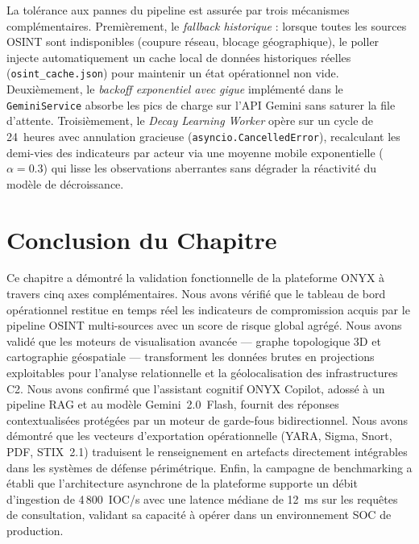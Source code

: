 La tolérance aux pannes du pipeline est assurée par trois mécanismes complémentaires. Premièrement, le \textit{fallback historique} : lorsque toutes les sources OSINT sont indisponibles (coupure réseau, blocage géographique), le poller injecte automatiquement un cache local de données historiques réelles (\texttt{osint\_cache.json}) pour maintenir un état opérationnel non vide. Deuxièmement, le \textit{backoff exponentiel avec gigue} implémenté dans le \texttt{GeminiService} absorbe les pics de charge sur l'API Gemini sans saturer la file d'attente. Troisièmement, le \textit{Decay Learning Worker} opère sur un cycle de 24~heures avec annulation gracieuse (\texttt{asyncio.CancelledError}), recalculant les demi-vies des indicateurs par acteur via une moyenne mobile exponentielle ($\alpha = 0.3$) qui lisse les observations aberrantes sans dégrader la réactivité du modèle de décroissance.

\section{Conclusion du Chapitre}

Ce chapitre a démontré la validation fonctionnelle de la plateforme ONYX à travers cinq axes complémentaires. Nous avons vérifié que le tableau de bord opérationnel restitue en temps réel les indicateurs de compromission acquis par le pipeline OSINT multi-sources avec un score de risque global agrégé. Nous avons validé que les moteurs de visualisation avancée --- graphe topologique 3D et cartographie géospatiale --- transforment les données brutes en projections exploitables pour l'analyse relationnelle et la géolocalisation des infrastructures C2. Nous avons confirmé que l'assistant cognitif ONYX Copilot, adossé à un pipeline RAG et au modèle Gemini~2.0~Flash, fournit des réponses contextualisées protégées par un moteur de garde-fous bidirectionnel. Nous avons démontré que les vecteurs d'exportation opérationnelle (YARA, Sigma, Snort, PDF, STIX~2.1) traduisent le renseignement en artefacts directement intégrables dans les systèmes de défense périmétrique. Enfin, la campagne de benchmarking a établi que l'architecture asynchrone de la plateforme supporte un débit d'ingestion de 4\,800~IOC/s avec une latence médiane de 12~ms sur les requêtes de consultation, validant sa capacité à opérer dans un environnement SOC de production.

